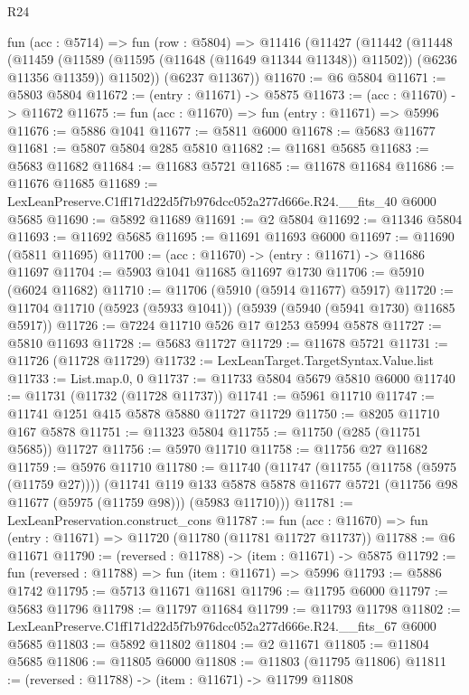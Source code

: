 \begin{lexlean}{R24}
\begin{coremodule}
  fun (acc : @5714) =>
  fun (row : @5804) =>
  @11416
    (@11427
      (@11442
        (@11448
          (@11459 (@11589 (@11595 (@11648 (@11649 @11344 @11348)) @11502)) (@6236 @11356 @11359))
          @11502))
      (@6237 @11367))
@11670 := @6 @5804
@11671 := @5803 @5804
@11672 := (entry : @11671) -> @5875
@11673 := (acc : @11670) -> @11672
@11675 := fun (acc : @11670) => fun (entry : @11671) => @5996
@11676 := @5886 @1041
@11677 := @5811 @6000
@11678 := @5683 @11677
@11681 := @5807 @5804 @285 @5810
@11682 := @11681 @5685
@11683 := @5683 @11682
@11684 := @11683 @5721
@11685 := @11678 @11684
@11686 := @11676 @11685
@11689 := LexLeanPreserve.C1ff171d22d5f7b976dcc052a277d666e.R24.__fits_40 @6000 @5685
@11690 := @5892 @11689
@11691 := @2 @5804
@11692 := @11346 @5804
@11693 := @11692 @5685
@11695 := @11691 @11693 @6000
@11697 := @11690 (@5811 @11695)
@11700 := (acc : @11670) -> (entry : @11671) -> @11686 @11697
@11704 := @5903 @1041 @11685 @11697 @1730
@11706 := @5910 (@6024 @11682)
@11710 := @11706 (@5910 (@5914 @11677) @5917)
@11720 := @11704 @11710 (@5923 (@5933 @1041)) (@5939 (@5940 (@5941 @1730) @11685 @5917))
@11726 := @7224 @11710 @526 @17 @1253 @5994 @5878
@11727 := @5810 @11693
@11728 := @5683 @11727
@11729 := @11678 @5721
@11731 := @11726 (@11728 @11729)
@11732 := LexLeanTarget.TargetSyntax.Value.list
@11733 := List.map.{0, 0}
@11737 := @11733 @5804 @5679 @5810 @6000
@11740 := @11731 (@11732 (@11728 @11737))
@11741 := @5961 @11710
@11747 := @11741 @1251 @415 @5878 @5880 @11727 @11729
@11750 := @8205 @11710 @167 @5878
@11751 := @11323 @5804
@11755 := @11750 (@285 (@11751 @5685)) @11727
@11756 := @5970 @11710
@11758 := @11756 @27 @11682
@11759 := @5976 @11710
@11780 := @11740
    (@11747
      (@11755 (@11758 (@5975 (@11759 @27))))
      (@11741
        @119
        @133
        @5878
        @5878
        @11677
        @5721
        (@11756 @98 @11677 (@5975 (@11759 @98)))
        (@5983 @11710)))
@11781 := LexLeanPreservation.construct_cons
@11787 := fun (acc : @11670) => fun (entry : @11671) => @11720 (@11780 (@11781 @11727 @11737))
@11788 := @6 @11671
@11790 := (reversed : @11788) -> (item : @11671) -> @5875
@11792 := fun (reversed : @11788) => fun (item : @11671) => @5996
@11793 := @5886 @1742
@11795 := @5713 @11671 @11681
@11796 := @11795 @6000
@11797 := @5683 @11796
@11798 := @11797 @11684
@11799 := @11793 @11798
@11802 := LexLeanPreserve.C1ff171d22d5f7b976dcc052a277d666e.R24.__fits_67 @6000 @5685
@11803 := @5892 @11802
@11804 := @2 @11671
@11805 := @11804 @5685
@11806 := @11805 @6000
@11808 := @11803 (@11795 @11806)
@11811 := (reversed : @11788) -> (item : @11671) -> @11799 @11808

\end{coremodule}
\end{lexlean}
